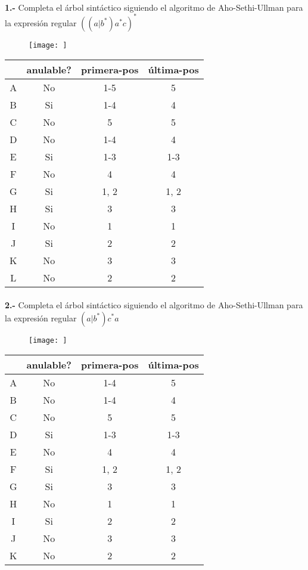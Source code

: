 \documentclass[11pt,a4paper]{report}
\begin{document}
\paragraph{}

\paragraph{}
\textbf{1.-} Completa el árbol sintáctico siguiendo el algoritmo de Aho-Sethi-Ullman para la expresión regular $ ((a|b^*)a^*c)^* $
\begin{figure}[ht!]
\centering
\texttt{[image: ]}
\end{figure}

\begin{tabular} {| c | c | c | c |}\hline
 & anulable? & primera-pos & última-pos\\ \hline
A & No & 1-5 & 5\\ \hline
B & Si & 1-4 & 4\\ \hline
C & No & 5 & 5\\ \hline
D & No & 1-4 & 4\\ \hline
E & Si & 1-3 & 1-3\\ \hline
F & No & 4 & 4\\ \hline
G & Si & 1, 2 & 1, 2\\ \hline
H & Si & 3 & 3\\ \hline
I & No & 1 & 1\\ \hline
J & Si & 2 & 2\\ \hline
K & No & 3 & 3\\ \hline
L & No & 2 & 2\\ \hline
\end{tabular}\paragraph{}
\textbf{2.-} Completa el árbol sintáctico siguiendo el algoritmo de Aho-Sethi-Ullman para la expresión regular $ (a|b^*)c^*a $
\begin{figure}[ht!]
\centering
\texttt{[image: ]}
\end{figure}

\begin{tabular} {| c | c | c | c |}\hline
 & anulable? & primera-pos & última-pos\\ \hline
A & No & 1-4 & 5\\ \hline
B & No & 1-4 & 4\\ \hline
C & No & 5 & 5\\ \hline
D & Si & 1-3 & 1-3\\ \hline
E & No & 4 & 4\\ \hline
F & Si & 1, 2 & 1, 2\\ \hline
G & Si & 3 & 3\\ \hline
H & No & 1 & 1\\ \hline
I & Si & 2 & 2\\ \hline
J & No & 3 & 3\\ \hline
K & No & 2 & 2\\ \hline
\end{tabular}
\end{document}

